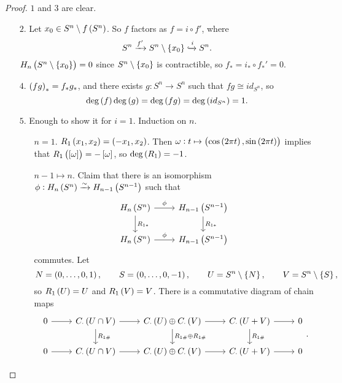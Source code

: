 \begin{proof}
$ 1 $ and $ 3 $ are clear.
\begin{itemize}
\item[$ 2 $.] Let $ x_0 \in S^n \setminus f\br{S^n} $. So $ f $ factors as $ f = i \circ f' $, where
$$ S^n \xrightarrow{f'} S^n \setminus \cbr{x_0} \xhookrightarrow{i} S^n. $$
$ H_n\br{S^n \setminus \cbr{x_0}} = 0 $ since $ S^n \setminus \cbr{x_0} $ is contractible, so $ f_* = i_* \circ f_*' = 0 $.
\item[$ 4 $.] $ \br{fg}_* = f_*g_* $, and there exists $ g : S^n \to S^n $ such that $ fg \cong id_{S^n} $, so
$$ \deg\br{f}\deg\br{g} = \deg\br{fg} = \deg\br{id_{S^n}} = 1. $$
\item[$ 5 $.] Enough to show it for $ i = 1 $. Induction on $ n $.
\begin{itemize}[leftmargin=2cm]
\item[$ n = 1 $.] $ R_1\br{x_1, x_2} = \br{-x_1, x_2} $. Then $ \omega : t \mapsto \br{\cos\br{2\pi t}, \sin\br{2\pi t}} $ implies that $ R_1\br{\sbr{\omega}} = -\sbr{\omega} $, so $ \deg\br{R_1} = -1 $.
\item[$ n - 1 \mapsto n $.] Claim that there is an isomorphism $ \phi : H_n\br{S^n} \xrightarrow{\sim} H_{n - 1}\br{S^{n - 1}} $ such that
$$
\begin{tikzcd}
H_n\br{S^n} \arrow{r}{\phi} \arrow{d}{R_{1*}} & H_{n - 1}\br{S^{n - 1}} \arrow{d}{R_{1*}} \\
H_n\br{S^n} \arrow{r}{\phi} & H_{n - 1}\br{S^{n - 1}}
\end{tikzcd}
$$
commutes. Let
$$ N = \br{0, \dots, 0, 1}, \qquad S = \br{0, \dots, 0, -1}, \qquad U = S^n \setminus \cbr{N}, \qquad V = S^n \setminus \cbr{S}, $$
so $ R_1\br{U} = U $ and $ R_1\br{V} = V $. There is a commutative diagram of chain maps
$$
\begin{tikzcd}
0 \arrow{r} & C_\cdot\br{U \cap V} \arrow{r} \arrow{d}{R_{1\#}} & C_\cdot\br{U} \oplus C_\cdot\br{V} \arrow{r} \arrow{d}{R_{1\#} \oplus R_{1\#}} & C_\cdot\br{U + V} \arrow{r} \arrow{d}{R_{1\#}} & 0 \\
0 \arrow{r} & C_\cdot\br{U \cap V} \arrow{r} & C_\cdot\br{U} \oplus C_\cdot\br{V} \arrow{r} & C_\cdot\br{U + V} \arrow{r} & 0
\end{tikzcd}.
$$

\pagebreak


\end{itemize}
\end{itemize}
\end{proof}
